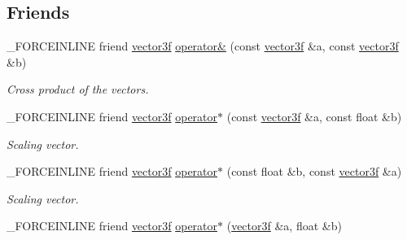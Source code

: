 \subsection*{Friends}
\begin{DoxyCompactItemize}
\item 
\hypertarget{classbt_1_1vector3f_a7c4ca9f575fd4a85e6af6a8eb14d5900}{\-\_\-\-F\-O\-R\-C\-E\-I\-N\-L\-I\-N\-E friend \hyperlink{classbt_1_1vector3f}{vector3f} \hyperlink{classbt_1_1vector3f_a7c4ca9f575fd4a85e6af6a8eb14d5900}{operator\&} (const \hyperlink{classbt_1_1vector3f}{vector3f} \&a, const \hyperlink{classbt_1_1vector3f}{vector3f} \&b)}\label{classbt_1_1vector3f_a7c4ca9f575fd4a85e6af6a8eb14d5900}

\begin{DoxyCompactList}\small\item\em Cross product of the vectors. \end{DoxyCompactList}\item 
\hypertarget{classbt_1_1vector3f_a7b5b362a1ffccc21fe4c38aebf21ee6e}{\-\_\-\-F\-O\-R\-C\-E\-I\-N\-L\-I\-N\-E friend \hyperlink{classbt_1_1vector3f}{vector3f} \hyperlink{classbt_1_1vector3f_a7b5b362a1ffccc21fe4c38aebf21ee6e}{operator$\ast$} (const \hyperlink{classbt_1_1vector3f}{vector3f} \&a, const float \&b)}\label{classbt_1_1vector3f_a7b5b362a1ffccc21fe4c38aebf21ee6e}

\begin{DoxyCompactList}\small\item\em Scaling vector. \end{DoxyCompactList}\item 
\hypertarget{classbt_1_1vector3f_a328e444d5008384e7e120c0a7e633481}{\-\_\-\-F\-O\-R\-C\-E\-I\-N\-L\-I\-N\-E friend \hyperlink{classbt_1_1vector3f}{vector3f} \hyperlink{classbt_1_1vector3f_a328e444d5008384e7e120c0a7e633481}{operator$\ast$} (const float \&b, const \hyperlink{classbt_1_1vector3f}{vector3f} \&a)}\label{classbt_1_1vector3f_a328e444d5008384e7e120c0a7e633481}

\begin{DoxyCompactList}\small\item\em Scaling vector. \end{DoxyCompactList}\item 
\hypertarget{classbt_1_1vector3f_aabb8db61f251ad274efea9814057e4c6}{\-\_\-\-F\-O\-R\-C\-E\-I\-N\-L\-I\-N\-E friend \hyperlink{classbt_1_1vector3f}{vector3f} \hyperlink{classbt_1_1vector3f_aabb8db61f251ad274efea9814057e4c6}{operator$\ast$} (\hyperlink{classbt_1_1vector3f}{vector3f} \&a, float \&b)}\label{classbt_1_1vector3f_aabb8db61f251ad274efea9814057e4c6}


\end{DoxyCompactItemize}
